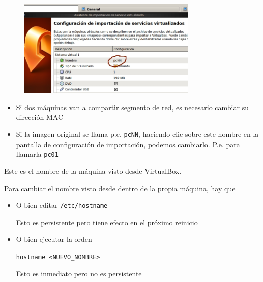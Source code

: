 \documentclass[ucs]{beamer}
\begin{document}
\begin{frame}[fragile]
\frametitle{}
\begin{center}
\begin{figure}
\centerline{\includegraphics[width=8.5cm]{figs/vbox01}}
\end{figure}
\end{center}

\begin{itemize}
\item
Si dos máquinas van a compartir segmento de red, es necesario cambiar su dirección MAC
\item
Si la imagen original se llama p.e. \verb|pcNN|, haciendo clic
sobre este nombre en la pantalla de configuración de importación,
podemos cambiarlo. P.e. para llamarla \verb|pc01|

\end{itemize}


\end{frame}

\begin{frame}[fragile]

Este es el nombre de la máquina visto desde VirtualBox.

Para cambiar el nombre visto desde dentro de la propia máquina,
hay que 

\begin{itemize}
\item
O bien 
editar \verb|/etc/hostname| 

Esto es persistente pero tiene efecto en el próximo reinicio
\item
O bien ejecutar la orden

\verb|hostname <NUEVO_NOMBRE>|

Esto es inmediato pero no es persistente

\end{itemize}
\end{frame}
\end{document}
